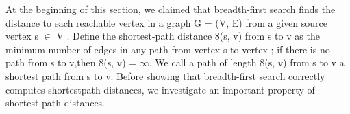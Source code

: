 \documentclass[preview]{standalone}
\begin{document}
\begin{center}
At the beginning of this section, we claimed that breadth-first search finds the distance to each reachable vertex in a graph G = (V, E) from a given source vertex s $\in$ V . Define the shortest-path distance 8(s, v) from s to v as the minimum number of edges in any path from vertex s to vertex ; if there is no path from s to v,then 8(s, v) = $\infty$. We call a path of length 8(s, v) from s to v a shortest path from s to v. Before showing that breadth-first search correctly computes shortestpath distances, we investigate an important property of shortest-path distances.
\end{center}
\end{document}
